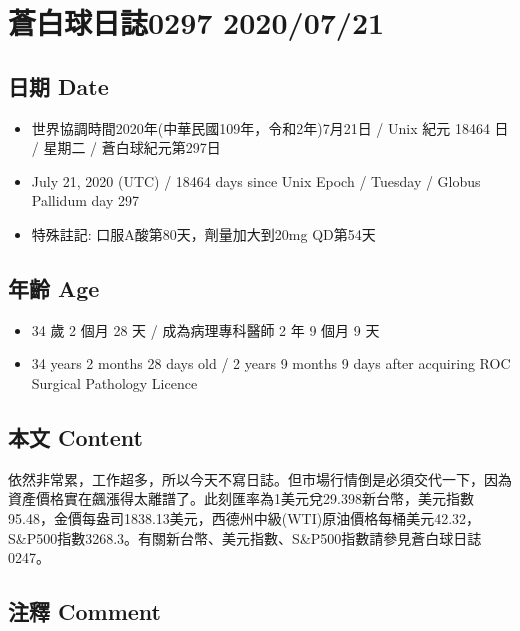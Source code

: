 \documentclass[
]{article}
\providecommand{\tightlist}{%
  \setlength{\itemsep}{0pt}\setlength{\parskip}{0pt}}
\begin{document}
\hypertarget{ux84bcux767dux7403ux65e5ux8a8c0297-20200721}{%
\section{蒼白球日誌0297
2020/07/21}\label{ux84bcux767dux7403ux65e5ux8a8c0297-20200721}}

\hypertarget{ux65e5ux671f-date-20}{%
\subsection{日期 Date}\label{ux65e5ux671f-date-20}}

\begin{itemize}
\tightlist
\item
  世界協調時間2020年(中華民國109年，令和2年)7月21日 / Unix 紀元 18464 日
  / 星期二 / 蒼白球紀元第297日
\item
  July 21, 2020 (UTC) / 18464 days since Unix Epoch / Tuesday / Globus
  Pallidum day 297
\item
  特殊註記: 口服A酸第80天，劑量加大到20mg QD第54天
\end{itemize}

\hypertarget{ux5e74ux9f61-age-20}{%
\subsection{年齡 Age}\label{ux5e74ux9f61-age-20}}

\begin{itemize}
\tightlist
\item
  34 歲 2 個月 28 天 / 成為病理專科醫師 2 年 9 個月 9 天
\item
  34 years 2 months 28 days old / 2 years 9 months 9 days after
  acquiring ROC Surgical Pathology Licence
\end{itemize}

\hypertarget{ux672cux6587-content-20}{%
\subsection{本文 Content}\label{ux672cux6587-content-20}}

依然非常累，工作超多，所以今天不寫日誌。但市場行情倒是必須交代一下，因為資產價格實在飆漲得太離譜了。此刻匯率為1美元兌29.398新台幣，美元指數95.48，金價每盎司1838.13美元，西德州中級(WTI)原油價格每桶美元42.32，S\&P500指數3268.3。有關新台幣、美元指數、S\&P500指數請參見蒼白球日誌0247。

\hypertarget{ux6ce8ux91cb-comment-20}{%
\subsection{注釋 Comment}\label{ux6ce8ux91cb-comment-20}}
\end{document}
